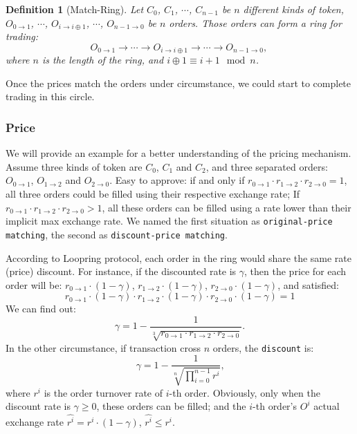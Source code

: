 \documentclass[UTF8,nofonts]{article}
\newtheorem{definition}{Definition}[section]
\begin{document}
\begin{definition}[Match-Ring] Let $C_{0}$, $C_{1}$, $\cdots$, $C_{n-1}$ be $n$ different kinds of token, $O_{0\rightarrow 1}$, $\cdots$, $O_{i\rightarrow i\oplus 1}$, $\cdots$, $O_{n-1 \rightarrow 0}$ be $n$ orders. Those orders can form a ring for trading:
$$O_{0\rightarrow 1} \rightarrow \cdots \rightarrow O_{i\rightarrow i\oplus 1} \rightarrow \cdots \rightarrow O_{n-1\rightarrow 0} \text{, }$$
where $n$ is the length of the ring, and $i\oplus 1 \equiv i+1 \mod n$.
\end{definition}

Once the prices match the orders under circumstance, we could start to complete trading in this circle.

\subsubsection{Price\label{sec: matchprice}}
We will provide an example for a better understanding of the pricing mechanism. Assume three kinds of token are $C_{0}$, $C_{1}$ and $C_{2}$, and three separated orders: $O_{0\rightarrow 1}$, $O_{1 \rightarrow 2}$ and $O_{2 \rightarrow 0}$. Easy to approve: if and only if $r_{0 \rightarrow 1} \cdot r_{1 \rightarrow 2}\cdot r_{2 \rightarrow 0} = 1$,  all three orders could be filled using their respective exchange rate; If $r_{0 \rightarrow 1} \cdot r_{1 \rightarrow 2}\cdot r_{2 \rightarrow 0} > 1$, all these orders can be filled using a rate lower than their implicit max exchange rate. We named the first situation as \texttt{original-price matching}, the second as \texttt{discount-price matching}.

According to Loopring protocol, each order in the ring would share the same rate (price) discount. For instance, if the discounted rate is $\gamma$, then the price for each order will be:
$r_{0\rightarrow 1} \cdot (1-\gamma)$, $r_{1\rightarrow 2} \cdot (1-\gamma)$, $r_{2 \rightarrow 0} \cdot (1-\gamma)$, and satisfied: 
\begin{equation}
r_{0\rightarrow 1} \cdot (1-\gamma)\cdot r_{1\rightarrow 2} \cdot (1-\gamma) \cdot r_{2 \rightarrow 0} \cdot (1-\gamma) = 1
\end{equation}
We can find out: 
\begin{equation*}
\gamma = 1- \frac{1}{\sqrt[3]{r_{0\rightarrow 1} \cdot r_{1\rightarrow 2} \cdot r_{2\rightarrow 0}}}\text{.}
\end{equation*}
In the other circumstance, if transaction cross $n$ orders, the \texttt{discount} is: 
\begin{equation*}
\gamma = 1- \frac{1}{\sqrt[n]{\prod_{i=0}^{n-1} r^i}} \text{,}
\end{equation*}
where $r^i$ is the order turnover rate of $i$-th order. Obviously, only when the discount rate is $\gamma \ge 0$, these orders can be filled; and the $i$-th order's $O^i$ actual exchange rate $\hat{r^i} = r^i \cdot (1-\gamma)$, $\hat{r^i}\le r^i$.
\end{document}

